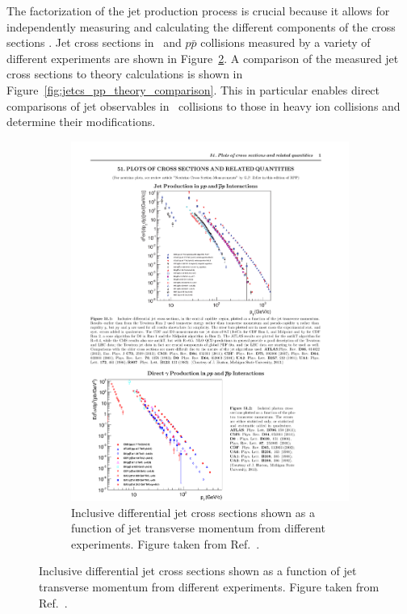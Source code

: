 The factorization of the jet production process is crucial because it allows for independently measuring and calculating the different components of the cross sections \cite{Majumder:2010qh}.
Jet cross sections in \pp\ and $p \bar{p}$ collisions measured by a variety of different experiments are shown in Figure~\ref{fig:jetcs_pp}.
A comparison of the measured jet cross sections to theory calculations is shown in Figure~\ref{fig:jetcs_pp_theory_comparison}.
This in particular enables direct comparisons of jet observables in \pp\ collisions to those in heavy ion collisions and determine their modifications.

 \begin{figure}
\centering
\begin{subfigure}{.45\textwidth}
  \centering
  \includegraphics[width=\linewidth]{figures/theory/jetcs_pp}
  \caption{Inclusive differential jet cross sections shown as a function of jet transverse momentum from different experiments.
  Figure taken from Ref.~\cite{Olive_2016}.}
  \label{fig:jetcs_pp}

\end{subfigure}
\end{figure}
